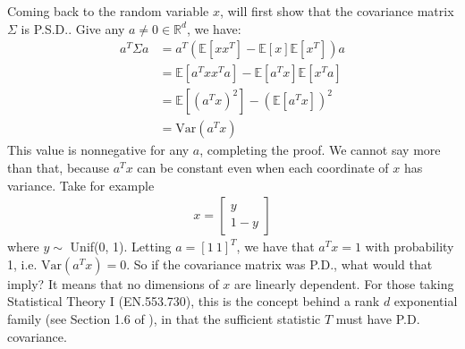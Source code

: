 \documentclass[11pt]{article}
\newcommand{\R}{\ensuremath{\mathbb R}}
\newcommand{\EV}{\ensuremath{\mathbb E}}
\newcommand{\Var}{\text{Var}}
\theoremstyle{plain}
\theoremstyle{definition}
\theoremstyle{remark}
\begin{document}
Coming back to the random variable $x$, will first show that the covariance matrix $\Sigma$ is P.S.D.. Give any $a \neq 0 \in \R^d$, we have:
\begin{align*}
    a^T \Sigma a &= a^T (\EV[xx^T] - \EV[x]\EV[x^T]) a\\
    &= \EV[a^Txx^Ta] - \EV[a^Tx]\EV[x^Ta] \\
    &= \EV[(a^T x)^2] - (\EV[a^T x])^2 \\
    &= \Var(a^T x)
\end{align*}
This value is nonnegative for any $a$, completing the proof. We cannot say more than that, because $a^T x$ can be constant even when each coordinate of $x$ has variance. Take for example
\begin{align*}
    x = \begin{bmatrix}y \\ 1 - y \end{bmatrix}
\end{align*}
where $y \sim $ Unif(0, 1). Letting $a = [1 \ 1]^T$, we have that $a^Tx = 1$ with probability 1, i.e. $\Var(a^Tx) = 0$. So if the covariance matrix was P.D., what would that imply? It means that no dimensions of $x$ are linearly dependent. For those taking Statistical Theory I (EN.553.730), this is the concept behind a rank $d$ exponential family (see Section 1.6 of \citet{bickel}), in that the sufficient statistic $T$ must have P.D. covariance.
\end{document}
